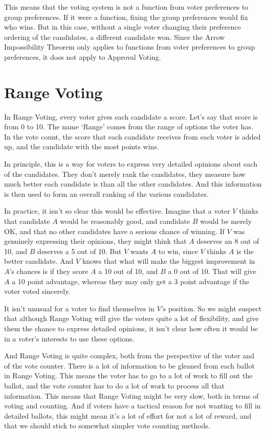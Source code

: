 \documentclass[11pt,]{article}
\begin{document}
This means that the voting system is not a function from voter
preferences to group preferences. If it were a function, fixing the
group preferences would fix who wins. But in this case, without a single
voter changing their preference ordering of the candidates, a different
candidate won. Since the Arrow Impossibility Theorem only applies to
functions from voter preferences to group preferences, it does not apply
to Approval Voting.

\hypertarget{range-voting}{%
\section{Range Voting}\label{range-voting}}

In Range Voting, every voter gives each candidate a score. Let's say
that score is from 0 to 10. The name `Range' comes from the range of
options the voter has. In the vote count, the score that each candidate
receives from each voter is added up, and the candidate with the most
points wins.

In principle, this is a way for voters to express very detailed opinions
about each of the candidates. They don't merely rank the candidates,
they measure how much better each candidate is than all the other
candidates. And this information is then used to form an overall ranking
of the various candidates.

In practice, it isn't so clear this would be effective. Imagine that a
voter \(V\) thinks that candidate \(A\) would be reasonably good, and
candidate \(B\) would be merely OK, and that no other candidates have a
serious chance of winning. If \(V\) was genuinely expressing their
opinions, they might think that \(A\) deserves an 8 out of 10, and \(B\)
deserves a 5 out of 10. But \(V\) wants \(A\) to win, since \(V\) thinks
\(A\) is the better candidate. And \(V\) knows that what will make the
biggest improvement in \(A\)'s chances is if they score \(A\) a 10 out
of 10, and \(B\) a 0 out of 10. That will give \(A\) a 10 point
advantage, whereas they may only get a 3 point advantage if the voter
voted sincerely.

It isn't unusual for a voter to find themselves in \(V\)'s position. So
we might suspect that although Range Voting will give the voters quite a
lot of flexibility, and give them the chance to express detailed
opinions, it isn't clear how often it would be in a voter's interests to
use these options.

And Range Voting is quite complex, both from the perspective of the
voter and of the vote counter. There is a lot of information to be
gleaned from each ballot in Range Voting. This means the voter has to go
to a lot of work to fill out the ballot, and the vote counter has to do
a lot of work to process all that information. This means that Range
Voting might be very slow, both in terms of voting and counting. And if
voters have a tactical reason for not wanting to fill in detailed
ballots, this might mean it's a lot of effort for not a lot of reward,
and that we should stick to somewhat simpler vote counting methods.
\end{document}
